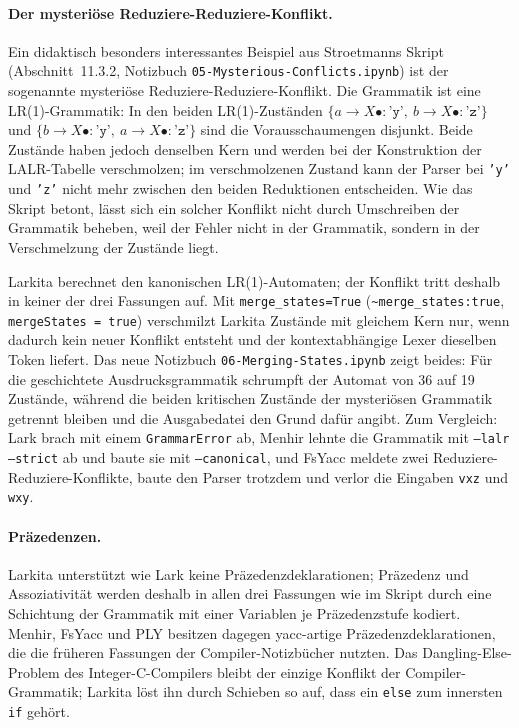 \paragraph{Der mysteriöse Reduziere-Reduziere-Konflikt.}
Ein didaktisch besonders interessantes Beispiel aus Stroetmanns Skript (Abschnitt~11.3.2, Notizbuch \texttt{05-Mysterious-Conflicts.ipynb}) ist der sogenannte mysteriöse Reduziere-Reduziere-Konflikt.
Die Grammatik ist eine LR(1)-Grammatik: In den beiden LR(1)-Zuständen $\{a \to X\bullet : \texttt{'y'},\ b \to X\bullet : \texttt{'z'}\}$ und $\{b \to X\bullet : \texttt{'y'},\ a \to X\bullet : \texttt{'z'}\}$ sind die Vorausschaumengen disjunkt.
Beide Zustände haben jedoch denselben Kern und werden bei der Konstruktion der LALR-Tabelle verschmolzen; im verschmolzenen Zustand kann der Parser bei \texttt{'y'} und \texttt{'z'} nicht mehr zwischen den beiden Reduktionen entscheiden.
Wie das Skript betont, lässt sich ein solcher Konflikt nicht durch Umschreiben der Grammatik beheben, weil der Fehler nicht in der Grammatik, sondern in der Verschmelzung der Zustände liegt.

Larkita berechnet den kanonischen LR(1)-Automaten; der Konflikt tritt deshalb in keiner der drei Fassungen auf.
Mit \texttt{merge\_states=True} (\texttt{\textasciitilde merge\_states:true}, \texttt{mergeStates = true}) verschmilzt Larkita Zustände mit gleichem Kern nur, wenn dadurch kein neuer Konflikt entsteht und der kontextabhängige Lexer dieselben Token liefert.
Das neue Notizbuch \texttt{06-Merging-States.ipynb} zeigt beides: Für die geschichtete Ausdrucksgrammatik schrumpft der Automat von 36 auf 19 Zustände, während die beiden kritischen Zustände der mysteriösen Grammatik getrennt bleiben und die Ausgabedatei den Grund dafür angibt.
Zum Vergleich: Lark brach mit einem \texttt{GrammarError} ab, Menhir lehnte die Grammatik mit \texttt{--lalr --strict} ab und baute sie mit \texttt{--canonical}, und FsYacc meldete zwei Reduziere-Reduziere-Konflikte, baute den Parser trotzdem und verlor die Eingaben \texttt{vxz} und \texttt{wxy}.

\paragraph{Präzedenzen.}
Larkita unterstützt wie Lark keine Präzedenzdeklarationen; Präzedenz und Assoziativität werden deshalb in allen drei Fassungen wie im Skript durch eine Schichtung der Grammatik mit einer Variablen je Präzedenzstufe kodiert.
Menhir, FsYacc und PLY besitzen dagegen yacc-artige Präzedenzdeklarationen, die die früheren Fassungen der Compiler-Notizbücher nutzten.
Das Dangling-Else-Problem des Integer-C-Compilers bleibt der einzige Konflikt der Compiler-Grammatik; Larkita löst ihn durch Schieben so auf, dass ein \texttt{else} zum innersten \texttt{if} gehört.

